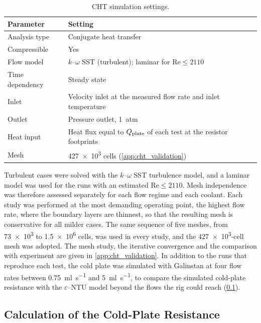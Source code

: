 \begin{table}[htbp]
  \centering
  \caption{CHT simulation settings.}
  \label{tab:simulation-setup}
  \small
  \begin{tabular}{@{}ll@{}}
    \toprule
    Parameter & Setting \\
    \midrule
    Analysis type    & Conjugate heat transfer \\
    Compressible     & Yes \\
    Flow model       & $k$--$\omega$ SST (turbulent); laminar for $\mathrm{Re} \leq 2110$ \\
    Time dependency  & Steady state \\
    Inlet            & Velocity inlet at the measured flow rate and inlet temperature \\
    Outlet           & Pressure outlet, \SI{1}{atm} \\
    Heat input       & Heat flux equal to $Q_{\mathrm{plate}}$ of each test at the resistor footprints \\
    Mesh             & \num{427e3} cells (\cref{app:cht_validation}) \\
    \bottomrule
  \end{tabular}
\end{table}

Turbulent cases were solved with the $k$--$\omega$ SST turbulence model, and a
laminar model was used for the runs with an estimated $\mathrm{Re} \leq 2110$.
Mesh independence was therefore assessed separately for each flow regime and
each coolant. Each study was performed at the most demanding operating point,
the highest flow rate, where the boundary layers are thinnest, so that the
resulting mesh is conservative for all milder cases. The same sequence of five
meshes, from \num{73e3} to \num{1.5e6} cells, was used in every study, and the
\num{427e3}-cell mesh was adopted. The mesh study, the iterative convergence and
the comparison with experiment are given in \cref{app:cht_validation}. In
addition to the runs that reproduce each test, the cold plate was simulated
with Galinstan at four flow rates between \SI{0.75}{\milli\litre\per\second}
and \SI{5}{\milli\litre\per\second}, to compare the simulated cold-plate
resistance with the $\varepsilon$--NTU model beyond the flows the rig could
reach (\cref{sec:rcp-calc}).

\subsection{Calculation of the Cold-Plate Resistance}
\label{sec:rcp-calc}

